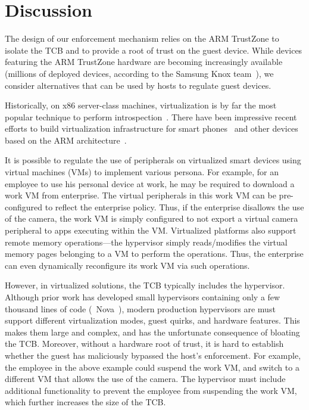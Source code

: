 \section{Discussion}
\label{section:discussion}



\label{section:discussion:alternatives}
%
The design of our enforcement mechanism relies on the ARM TrustZone to isolate
the TCB and to provide a root of trust on the guest device. While devices
featuring the ARM TrustZone hardware are becoming increasingly available
(millions of deployed devices, according to the Samsung Knox
team~\cite{knox:ccs14}), we consider alternatives that can be used by
hosts to regulate guest devices.

%
Historically, on x86 server-class machines, virtualization is by far the most
popular technique to perform introspection~\cite{chennoble:hotos01,vmi:ndss03}.
There have been impressive recent efforts to build virtualization
infrastructure for smart
phones~\cite{cells:sosp11,cox:hotmobile07,vmwareverizon} and other devices
based on the ARM architecture~\cite{kvmarm:asplos14}.

It is possible to regulate the use of peripherals on virtualized smart devices
using virtual machines (VMs) to implement various persona. For example, for an
employee to use his personal device at work, he may be required to download a
work VM from enterprise. The virtual peripherals in this work VM can be
pre-configured to reflect the enterprise policy. Thus, if the enterprise
disallows the use of the camera, the work VM is simply configured to not export
a virtual camera peripheral to apps executing within the VM. Virtualized
platforms also support remote memory operations---the hypervisor simply
reads/modifies the virtual memory pages belonging to a VM to perform the
operations. Thus, the enterprise can even dynamically reconfigure its work VM
via such operations.

However, in virtualized solutions, the TCB typically includes the hypervisor.
Although prior work has developed small hypervisors containing only a few
thousand lines of code (\eg~Nova~\cite{nova:eurosys09}), modern production
hypervisors are must support different virtualization modes, guest quirks, and
hardware features. This makes them large and complex, and has the unfortunate
consequence of bloating the TCB. Moreover, without a hardware root of trust, it
is hard to establish whether the guest has maliciously bypassed the host's
enforcement. For example, the employee in the above example could suspend the
work VM, and switch to a different VM that allows the use of the camera. The
hypervisor must include additional functionality to prevent the employee from
suspending the work VM, which further increases the size of the TCB.

